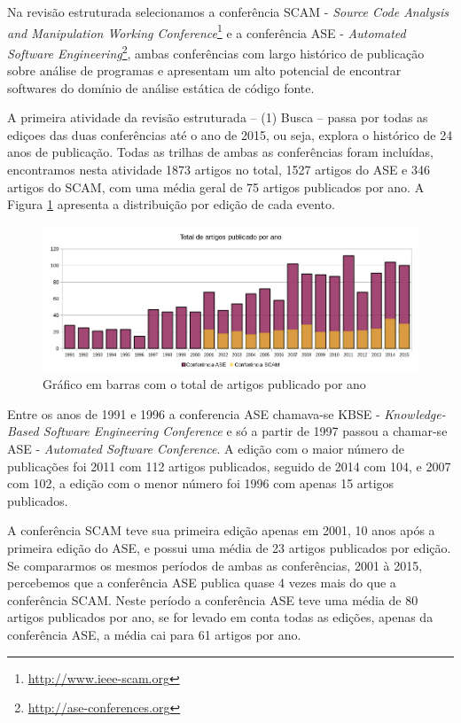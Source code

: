 Na revisão estruturada selecionamos a conferência SCAM - {\it
Source Code Analysis and Manipulation Working
Conference}\footnote{\url{http://www.ieee-scam.org}} e a conferência ASE - {\it
Automated Software Engineering}\footnote{\url{http://ase-conferences.org}},
ambas conferências com largo histórico de publicação sobre análise de
programas e apresentam um alto potencial de encontrar softwares do domínio de
análise estática de código fonte.

A primeira atividade da revisão estruturada -- (1) Busca -- passa por
todas as ediçoes das duas conferências até o ano de 2015, ou seja, explora o
histórico de 24 anos de publicação. Todas as trilhas de ambas as conferências
foram incluídas, encontramos nesta atividade 1873 artigos no total, 1527 artigos
do ASE e 346 artigos do SCAM, com uma média geral de 75 artigos publicados por ano. A
Figura \ref{artigos-por-ano} apresenta a distribuição por edição de cada
evento.

\begin{figure}[h]
  \center
  \includegraphics[scale=0.65]{imagens/artigos-por-ano.png}
  \caption{Gráfico em barras com o total de artigos publicado por ano}
  \label{artigos-por-ano}
\end{figure}

Entre os anos de 1991 e 1996 a conferencia ASE chamava-se KBSE - {\it
Knowledge-Based Software Engineering Conference} e só a partir de 1997 passou a
chamar-se ASE - {\it Automated Software Conference}. A edição com o maior
número de publicações foi 2011 com 112 artigos publicados, seguido de 2014 com
104, e 2007 com 102, a edição com o menor número foi 1996 com apenas 15 artigos
publicados.

A conferência SCAM teve sua primeira edição apenas em 2001, 10 anos após a
primeira edição do ASE, e possui uma média de 23 artigos publicados por edição.
Se compararmos os mesmos períodos de ambas as conferências, 2001 à 2015,
percebemos que a conferência ASE publica quase 4 vezes mais do que a
conferência SCAM. Neste período a conferência ASE teve uma média de 80 artigos
publicados por ano, se for levado em conta todas as edições, apenas da
conferência ASE, a média cai para 61 artigos por ano.

